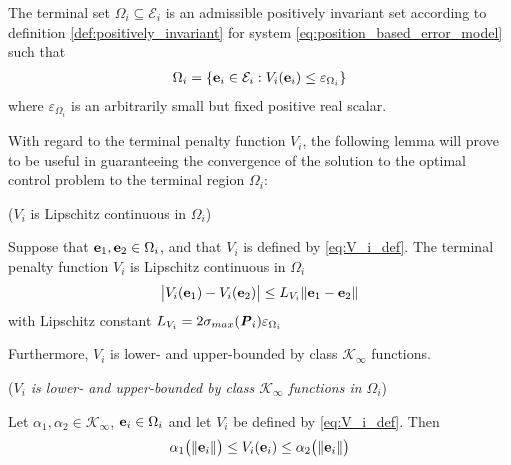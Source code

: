 The terminal set $\Omega_i \subseteq \mathcal{E}_i$ is an admissible
positively invariant set according to definition
\eqref{def:positively_invariant} for system
\eqref{eq:position_based_error_model} such that
\begin{align}
  \Omega_i = \{\bm{\mathbf{e}}_i \in \mathcal{E}_i : V_i(\bm{\mathbf{e}}_i) \leq \varepsilon_{\Omega_i} \}
\end{align}
where $\varepsilon_{\Omega_i}$ is an arbitrarily small but fixed positive real scalar.

With regard to the terminal penalty function $V_i$, the following lemma will
prove to be useful in guaranteeing the convergence of the solution to the
optimal control problem to the terminal region $\Omega_i$:

\begin{bw_box}
\begin{lemma} ($V_i$ is Lipschitz continuous in $\Omega_i$)
\label{lemma:V_Lipschitz_e_0}

  Suppose that $\bm{\mathbf{e}}_1, \bm{\mathbf{e}}_2 \in \Omega_i$, and that
  $V_i$ is defined by \eqref{eq:V_i_def}. The terminal penalty function
  $V_i$ is Lipschitz continuous in $\Omega_i$
  $$\big|V_i(\bm{\mathbf{e}}_1) - V_i(\bm{\mathbf{e}}_2)\big| \leq L_{V_i} \|\bm{\mathbf{e}}_1 - \bm{\mathbf{e}}_2\|$$
  with Lipschitz constant $L_{V_i} = 2 \sigma_{max}(\bm{\mathit{P}}_i) \varepsilon_{\Omega_i} $\\

\end{lemma}
\end{bw_box}


Furthermore, $V_i$ is lower- and upper-bounded by class $\mathcal{K}_{\infty}$ functions.

\begin{bw_box}
  \begin{lemma} (\textit{$V_i$ is lower- and upper-bounded by class
      \label{lemma:V_i_lower_upper_bounded}
    $\mathcal{K}_{\infty}$ functions in $\Omega_i$})
  \end{lemma}

  Let $\alpha_1, \alpha_2 \in \mathcal{K}_{\infty}$, $\bm{\mathbf{e}}_i \in \Omega_i$
  and let $V_i$ be defined by \eqref{eq:V_i_def}. Then
  \begin{align}
    \alpha_1\big(\|\bm{\mathbf{e}}_i\|\big) \leq V_i(\bm{\mathbf{e}}_i) \leq \alpha_2\big(\| \bm{\mathbf{e}}_i \|\big)
  \end{align}

\end{bw_box}


